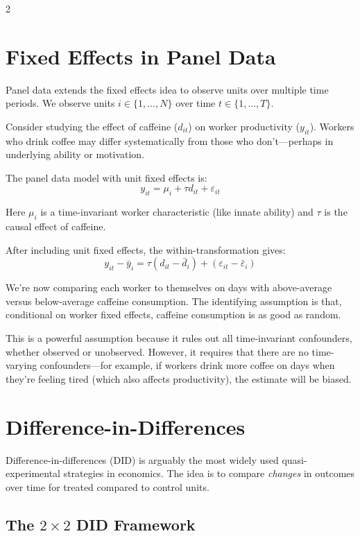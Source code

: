 \documentclass[12pt]{article}
\begin{document}
\begin{multicols}{2}
\section*{Fixed Effects in Panel Data}

Panel data extends the fixed effects idea to observe units over multiple time periods.
We observe units $i \in \{1, \dots, N\}$ over time $t \in \{1, \dots, T\}$.

Consider studying the effect of caffeine ($d_{it}$) on worker productivity ($y_{it}$).
Workers who drink coffee may differ systematically from those who don't---perhaps in underlying ability or motivation.

The panel data model with unit fixed effects is:
$$
  y_{it} = \mu_i + \tau d_{it} + \varepsilon_{it}
$$

Here $\mu_i$ is a time-invariant worker characteristic (like innate ability) and $\tau$ is the causal effect of caffeine.

After including unit fixed effects, the within-transformation gives:
$$
  y_{it} - \bar{y}_i = \tau (d_{it} - \bar{d}_i) + (\varepsilon_{it} - \bar{\varepsilon}_i)
$$

We're now comparing each worker to themselves on days with above-average versus below-average caffeine consumption.
The identifying assumption is that, conditional on worker fixed effects, caffeine consumption is as good as random.

This is a powerful assumption because it rules out all time-invariant confounders, whether observed or unobserved.
However, it requires that there are no time-varying confounders---for example, if workers drink more coffee on days when they're feeling tired (which also affects productivity), the estimate will be biased.


\newpage

\section*{Difference-in-Differences}

Difference-in-differences (DID) is arguably the most widely used quasi-experimental strategies in economics.
The idea is to compare \emph{changes} in outcomes over time for treated compared to control units. 

\subsection*{The $2 \times 2$ DID Framework}


\end{multicols}
\end{document}
